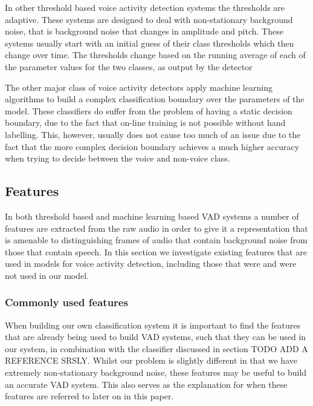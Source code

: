 \documentclass[ %
                    author={Sam Phippen},
                supervisor={Dr. Rafal Bogacz},
                     title={Real time voice activity detectors in noisy personal computing environments},
                  subtitle={},
                    degree={MEng},
                      year={2012} ]{thesis}
\begin{document}
In other threshold based voice activity detection systems the thresholds are
adaptive\cite{gokhun}. These systems are designed to deal with non-stationary
background noise, that is background noise that changes in amplitude and pitch.
These systems usually start with an initial guess of their class thresholds
which then change over time. The thresholds change based on the running average
of each of the parameter values for the two classes, as output by the
detector\cite{sakhnov}

The other major class of voice activity detectors apply machine learning
algorithms to build a complex classification boundary over the parameters of
the model\cite{shin}. These classifiers do suffer from the problem of having a static
decision boundary, due to the fact that on-line training is not possible
without hand labelling. This, however, usually does not cause too much of an
issue due to the fact that the more complex decision boundary achieves a much
higher accuracy when trying to decide between the voice and non-voice class.

\subsection {Features}

In both threshold based and machine learning based VAD systems a number of
features are extracted from the raw audio in order to give it a representation
that is amenable to distinguishing frames of audio that contain background
noise from those that contain speech. In this section we investigate existing
features that are used in models for voice activity detection, including those
that were and were not used in our model.

\subsubsection{Commonly used features}

When building our own classification system it is important to find the
features that are already being used to build VAD systems, such that they can
be used in our system, in combination with the classifier discussed in section
TODO ADD A REFERENCE SRSLY. Whilst our problem is slightly different in that we
have extremely non-stationary background noise, these features may be useful to
build an accurate VAD system. This also serves as the explanation for when
these features are referred to later on in this paper.
\end{document}
